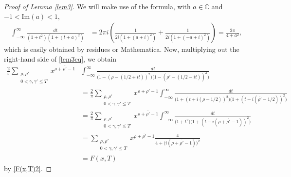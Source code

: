 \documentclass{amsart}
\newcommand{\1}{\mathbbm{1}}
\theoremstyle{remark}
\numberwithin{equation}{section}
\begin{document}
\begin{proof}[Proof of Lemma \ref{lem3}] We will make use of the formula, with $a\in \mathbb{C}$ and $-1< \text{Im}(a)<1$,
\begin{equation}\label{integral}
\begin{aligned}
\int_{-\infty}^\infty \frac{dt}{(1+t^2)(1+(t+a)^2)} &= 2\pi i \left( \frac1{2i(1+(a+i)^2)} + \frac1{2i(1+(-a+i)^2)} \right)= \frac{2\pi}{4+a^2},
\end{aligned}
\end{equation}
which is easily obtained by residues or Mathematica.
Now, multiplying out the right-hand side of \eqref{lem3eq}, we obtain 
\[ \begin{split} \frac{2}{\pi} \sum_{\substack{\rho, \rho' \\ 0<\gamma,\gamma' \le T}} x^{\rho+\overline{\rho'}-1}& \int_{-\infty}^\infty \frac{dt}{\big(1- \left(\rho -(1/2+it)\right)^2\big)\big(1- \left(\overline{\rho'} -(1/2-it)\right)^2\big)}\\&
=\frac{2}{\pi} \sum_{\substack{\rho, \rho' \\ 0<\gamma,\gamma' \le T}} x^{\rho+\overline{\rho'}-1}
\int_{-\infty}^\infty \frac{dt}{\big(1+ \left(t+i(\rho -1/2)\right)^2\big)\big(1+ \left(t-i(\overline{\rho'} -1/2)\right)^2\big)} \\&
=\frac{2}{\pi} \sum_{\substack{\rho, \rho' \\ 0<\gamma,\gamma' \le T}} x^{\rho+\overline{\rho'}-1}
\int_{-\infty}^\infty \frac{dt}{\big(1+ t^2\big)\big(1+ \left(t-i(\rho +\overline{\rho'} -1 )\right)^2\big)}\\&
= \sum_{\substack{\rho, \rho' \\ 0<\gamma,\gamma' \le T}} x^{\rho+\overline{\rho'}-1}\frac{4}{4+ \big(i(\rho +\overline{\rho'} -1)\big)^2}\\& 
= F(x,T)
\end{split}\]
by \eqref{F(x,T)2}.
\end{proof}
\end{document}
